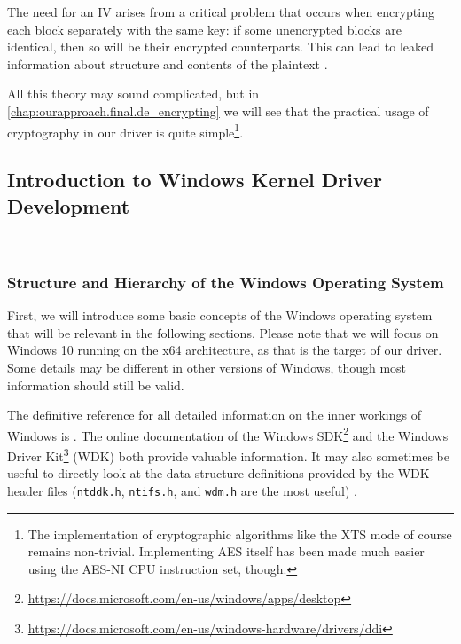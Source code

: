 The need for an IV arises from a critical problem that occurs when encrypting each block separately with the same key: if some unencrypted blocks are identical, then so will be their encrypted counterparts. This can lead to leaked information about structure and contents of the plaintext \cite{Ferguson2010}.

All this theory may sound complicated, but in \autoref{chap:ourapproach.final.de_encrypting} we will see that the practical usage of cryptography in our driver is quite simple\footnote{\label{fn:background.luks2.simplecryptography} The implementation of cryptographic algorithms like the XTS mode of course remains non-trivial. Implementing AES itself has been made much easier using the AES-NI CPU instruction set, though.}.

\subsection{Introduction to Windows Kernel Driver Development}
\label{chap:background.kerneldriver}
\\

\subsubsection{Structure and Hierarchy of the Windows Operating System}
\label{chap:background.kerneldriver.oshierarchy}
First, we will introduce some basic concepts of the Windows operating system that will be relevant in the following sections. Please note that we will focus on Windows 10 running on the x64 architecture, as that is the target of our driver. Some details may be different in other versions of Windows, though most information should still be valid.

The definitive reference for all detailed information on the inner workings of Windows is \cite{Yosifovich2017}. The online documentation of the Windows SDK\footnote{\label{fn:background.kerneldriver.sdkdoc} \url{https://docs.microsoft.com/en-us/windows/apps/desktop}} and the Windows Driver Kit\footnote{\label{fn:background.kernekdriver.wdkdoc} \url{https://docs.microsoft.com/en-us/windows-hardware/drivers/ddi}} (WDK) both provide valuable information. It may also sometimes be useful to directly look at the data structure definitions provided by the WDK header files (\texttt{ntddk.h}, \texttt{ntifs.h}, and \texttt{wdm.h} are the most useful) \cite{Yosifovich2017}.

